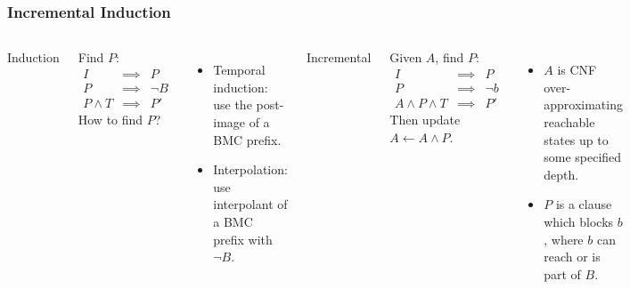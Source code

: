 \documentclass{beamer}
\begin{document}
\begin{frame}
	\frametitle{Incremental Induction}
	\begin{columns}
		\begin{center}Induction\end{center}
		Find $P$:
		\begin{align*}
			I & \implies & P\\
			P & \implies & \neg B\\
			P \wedge T & \implies & P'
		\end{align*}
		How to find $P$?
		\begin{itemize}
			\item Temporal induction: use the post-image of a BMC prefix.
			\item Interpolation: use interpolant of a BMC prefix with $\neg B$.
		\end{itemize}
		\begin{center}Incremental\end{center}
		Given $A$, find $P$:
		\begin{align*}
			I & \implies & P\\
			P & \implies & \neg b\\
			A \wedge P \wedge T & \implies & P'
		\end{align*}
		Then update $A \leftarrow A \wedge P$.

		\begin{itemize}
			\item $A$ is CNF over-approximating reachable states up to some specified depth.
			\item $P$ is a clause which blocks $b$, where $b$ can reach or is part of $B$.
		\end{itemize}
	\end{columns}
\end{frame}
\end{document}
